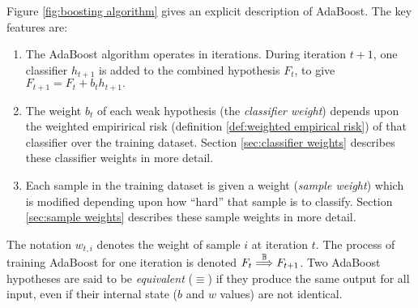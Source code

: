 Figure \ref{fig:boosting algorithm} gives an explicit description of
AdaBoost.  The key features are:
%
\begin{enumerate}
\item	The AdaBoost algorithm operates in iterations.  During
	iteration $t+1$, one classifier $h_{t+1}$ is added to the combined
	hypothesis $F_{t}$, to give $F_{t+1} = F_t + b_t h_{t+1}.$
\item	The weight $b_t$ of each weak hypothesis (the \emph{classifier
	weight}) depends upon the weighted empirirical risk
	(definition \ref{def:weighted empirical risk}) of that
	classifier over the training dataset.  Section
	\ref{sec:classifier weights} describes these classifier
	weights in more detail.
\item	Each sample in the training dataset is given a weight
	(\emph{sample weight}) which is modified depending upon how
	``hard'' that sample is to classify.  Section \ref{sec:sample
	weights} describes these sample weights in more detail.
\end{enumerate}

The notation $w_{t,i}$ denotes the weight of sample $i$ at iteration
$t$.  The process of training AdaBoost for one iteration is denoted $F_t
\stackrel{\mathbb{B}}{\Longrightarrow} F_{t+1}$.   Two AdaBoost hypotheses are said to be
\emph{equivalent} ($\equiv$) if they produce the same output for all
input, even if their internal state ($b$ and $w$ values) are not
identical.


